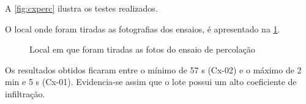 

A \cref{fig:cxperc} ilustra os testes realizados.


O local onde foram tiradas as fotografias
dos ensaios, é apresentado na \cref{fig:fotosperc}.

\begin{figure}[htb!]
	\setlength\fboxsep{0pt}
	\setlength\fboxrule{0.75pt}
	\caption{Local em que foram tiradas as fotos do ensaio de percolação}%
	\label{fig:fotosperc}
\end{figure}

\FloatBarrier
Os resultados obtidos ficaram entre o mínimo de 57 s (Cx-02) e o 
máximo de 
2 min e 5 s (Cx-01). Evidencia-se assim que o lote possui um alto coeficiente de 
infiltração.
